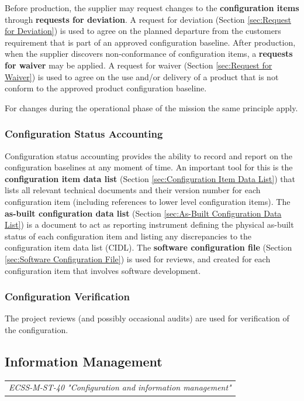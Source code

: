 Before production, the supplier may request changes to the \textbf{configuration items} through \textbf{requests for deviation}. A request for deviation (Section \ref{sec:Request for Deviation}) is used to agree on the planned departure from the customers requirement that is part of an approved configuration baseline. After production, when the supplier discovers non-conformance of configuration items, a \textbf{requests for waiver} may be applied.  A request for waiver (Section \ref{sec:Request for Waiver}) is used to agree on the use and/or delivery of a product that is not conform to the approved product configuration baseline.

For changes during the operational phase of the mission the same principle apply.

\subsubsection{Configuration Status Accounting}

Configuration status accounting provides the ability to record and report on the configuration baselines at any moment of time. An important tool for this is the \textbf{configuration item data list} (Section \ref{sec:Configuration Item Data List}) that lists all relevant technical documents and their version number for each configuration item (including references to lower level configuration items). The \textbf{as-built configuration data list} (Section \ref{sec:As-Built Configuration Data List}) is a document to act as reporting instrument defining the physical as-built status of each configuration item and listing any discrepancies to the configuration item data list (CIDL). The \textbf{software configuration file} (Section \ref{sec:Software Configuration File}) is used for reviews, and created for each configuration item that involves software development.

\subsubsection{Configuration Verification}

The project reviews (and possibly occasional audits) are used for verification of the configuration.

\subsection{Information Management}

\begin{tabular}{l}
\textit{ECSS-M-ST-40 "Configuration and information management" \cite{ECSS-M-ST-40}}
\end{tabular}


